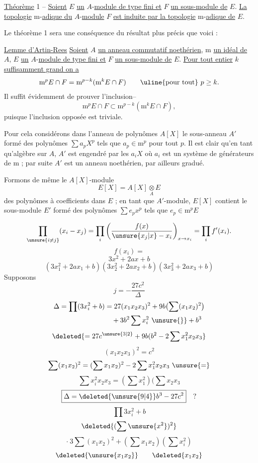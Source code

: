 \uline{Théorème} 1 -- \uline{Soient} $E$ \uline{un} $A$-\uline{module de type fini et} $F$ \uline{un sous-module de} $E$. \uline{La topologie} $\mathrm m$-\uline{adique du} $A$-\uline{module} $F$ \uline{est induite par la topologie} $\mathrm m$-\uline{adique de} $E$.

Le théorème 1 sera une conséquence du résultat plus précis que voici :

\uline{Lemme d'Artin-Rees} \unsure{--} \uline{Soient} $A$ \uline{un anneau commutatif noethérien}, $\mathrm m$ \uline{un idéal de} $A$, $E$ \uline{un} $A$-\uline{module de type fini et} $F$ \uline{un sous-module de} $E$. \uline{Pour tout entier} $k$ \uline{suffisamment grand on a}
\[
\mathrm m^pE\cap F=\mathrm m^{p-k}(\mathrm m^kE\cap F)\qquad\uline{\text{pour tout}}\ p\geq k.
\]
Il suffit évidemment de prouver l'inclusion\qquad --
\[
\mathrm m^pE\cap F\subset\mathrm m^{p-k}(\mathrm m^kE\cap F),
\]
puisque l'inclusion opposée est triviale.

Pour cela considérons dans l'anneau de polynômes $A[X]$ le sous-anneau $A'$ formé des polynômes $\sum a_pX^p$ tels que $a_p\in\mathrm m^p$ pour tout $p$. Il est clair qu'en tant qu'algèbre sur $A$, $A'$ est engendré par les $a_iX$ où $a_i$ est un système de générateurs de $\mathrm m$ ; par suite $A'$ est un anneau noethérien, par ailleurs gradué.

Formons de même le $A[X]$-module
\[
E[X]=A[X]\underset{A}{\otimes}E
\]
des polynômes à coefficients dans $E$ ; en tant que $A'$-module, $E[X]$ contient le sous-module $E'$ formé des polynômes $\sum e_px^p$ tels que $e_p\in\mathrm m^pE$


\[
\prod_{\unsure{i\ne j}}(x_i-x_j)=\prod_i\left(\frac{f(x)}{\unsure{x_j|x}-x_i}\right)_{x\to x_i}=\prod_i f'(x_i).
\]
\[
f(x_i)=
\]
\[
3x^2+2ax+b
\]
\[
(3x_1^2+2ax_1+b)(3x_2^2+2ax_2+b)(3x_3^2+2ax_3+b)
\]
Supposons  
\[
j=-\frac{27c^2}{\Delta}
\]
\[
\begin{aligned}
\Delta=\prod(3x_i^2+b)&=27(x_1x_2x_3)^2+9b\bigl(\sum(x_1x_2)^2\bigr)\\
&\quad+3b^2\sum x_i^2\ \unsure{\}}+b^3
\end{aligned}
\]
\[
\deleted{=27c^{\unsure{3|2}}+9b(b^2-2\sum x_1^2x_2x_3}
\]
\[
(x_1x_2x_3)^2=c^2
\]
\[
\sum(x_1x_2)^2=(\sum x_1x_2)^2-2\sum x_1^2x_2x_3\ \unsure{=}
\]
\[
\sum x_i^2x_2x_3=(\sum x_1^2)(\sum x_2x_3
\]
\[
\boxed{\Delta=\deleted{\unsure{9|4}}b^3-27c^2}\quad ?
\]
\[
\prod 3x_i^2+b
\]
\[
\deleted{(\sum\unsure{x^2})^2}
\]
\[
\cdot\ 3\sum(x_1x_2)^2+(\sum x_1x_2)(\sum x_i^2)
\]
\[
\deleted{\unsure{x_1x_2}}\qquad\deleted{x_1x_2}
\]

